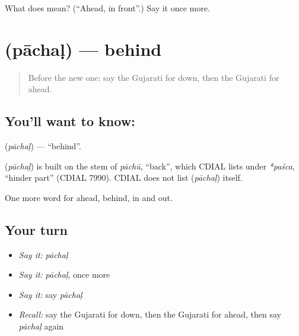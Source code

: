 \begin{tcolorbox}[breakable,colback=teal!4,colframe=teal!35!black,title={Before you move on}]
What does  mean? (\textquotedblleft{}Ahead, in front\textquotedblright{}.) Say it once more.
\end{tcolorbox}
\section[\texorpdfstring{\gu{પાછળ} (pāchaḷ)}{પાછળ (pāchaḷ)}]{ (pāchaḷ) — behind}

\label{lesson:GU-C75-behind}



\begin{quote}
Before the new one: say the Gujarati for down, then the Gujarati for ahead.
\end{quote}

\subsection*{You'll want to know: }
\textbf{} (\emph{pāchaḷ}) — \textquotedblleft{}behind\textquotedblright{}.

\begin{cousinweb}
\textbf{} (\emph{pāchaḷ}) is built on the stem of \emph{pāchũ}, \textquotedblleft{}back\textquotedblright{}, which CDIAL lists under \emph{*paśca}, \textquotedblleft{}hinder part\textquotedblright{} (CDIAL 7990). CDIAL does not list \textbf{} (\emph{pāchaḷ}) itself.
\end{cousinweb}

\begin{grammarlens}[title={What you've built}]
One more word for ahead, behind, in and out.
\end{grammarlens}

\subsection*{Your turn}
\begin{itemize}
\raggedright
  \item \emph{Say it:} \emph{pāchaḷ}
  \item \emph{Say it:} \emph{pāchaḷ}, once more
  \item \emph{Say it:} say \emph{pāchaḷ}
  \item \emph{Recall:} say the Gujarati for down, then the Gujarati for ahead, then say \emph{pāchaḷ} again
\end{itemize}


